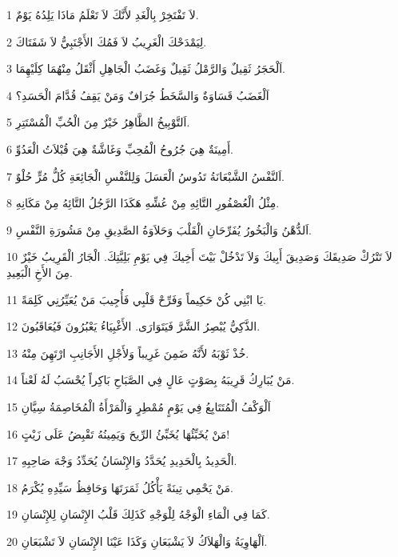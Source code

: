 \par 1 لاَ تَفْتَخِرْ بِالْغَدِ لأَنَّكَ لاَ تَعْلَمُ مَاذَا يَلِدُهُ يَوْمٌ.
\par 2 لِيَمْدَحْكَ الْغَرِيبُ لاَ فَمُكَ الأَجْنَبِيُّ لاَ شَفَتَاكَ.
\par 3 اَلْحَجَرُ ثَقِيلٌ وَالرَّمْلُ ثَقِيلٌ وَغَضَبُ الْجَاهِلِ أَثْقَلُ مِنْهُمَا كِلَيْهِمَا.
\par 4 اَلْغَضَبُ قَسَاوَةٌ وَالسَّخَطُ جُرَافٌ وَمَنْ يَقِفُ قُدَّامَ الْحَسَدِ؟
\par 5 اَلتَّوْبِيخُ الظَّاهِرُ خَيْرٌ مِنَ الْحُبِّ الْمُسْتَتِرِ.
\par 6 أَمِينَةٌ هِيَ جُرُوحُ الْمُحِبِّ وَغَاشَّةٌ هِيَ قُبْلاَتُ الْعَدُوِّ.
\par 7 اَلنَّفْسُ الشَّبْعَانَةُ تَدُوسُ الْعَسَلَ وَلِلنَّفْسِ الْجَائِعَةِ كُلُّ مُرٍّ حُلْوٌ.
\par 8 مِثْلُ الْعُصْفُورِ التَّائِهِ مِنْ عُشِّهِ هَكَذَا الرَّجُلُ التَّائِهُ مِنْ مَكَانِهِ.
\par 9 اَلدُّهْنُ وَالْبَخُورُ يُفَرِّحَانِ الْقَلْبَ وَحَلاَوَةُ الصَّدِيقِ مِنْ مَشُورَةِ النَّفْسِ.
\par 10 لاَ تَتْرُكْ صَدِيقَكَ وَصَدِيقَ أَبِيكَ وَلاَ تَدْخُلْ بَيْتَ أَخِيكَ فِي يَوْمِ بَلِيَّتِكَ. الْجَارُ الْقَرِيبُ خَيْرٌ مِنَ الأَخِ الْبَعِيدِ.
\par 11 يَا ابْنِي كُنْ حَكِيماً وَفَرِّحْ قَلْبِي فَأُجِيبَ مَنْ يُعَيِّرُنِي كَلِمَةً.
\par 12 الذَّكِيُّ يُبْصِرُ الشَّرَّ فَيَتَوَارَى. الأَغْبِيَاءُ يَعْبُرُونَ فَيُعَاقَبُونَ.
\par 13 خُذْ ثَوْبَهُ لأَنَّهُ ضَمِنَ غَرِيباً وَلأَجْلِ الأَجَانِبِ ارْتَهِنَ مِنْهُ.
\par 14 مَنْ يُبَارِكُ قَرِيبَهُ بِصَوْتٍ عَالٍ فِي الصَّبَاحِ بَاكِراً يُحْسَبُ لَهُ لَعْناً.
\par 15 اَلْوَكْفُ الْمُتَتَابِعُ فِي يَوْمٍ مُمْطِرٍ وَالْمَرْأَةُ الْمُخَاصِمَةُ سِيَّانِ
\par 16 مَنْ يُخَبِّئُهَا يُخَبِّئُ الرِّيحَ وَيَمِينُهُ تَقْبِضُ عَلَى زَيْتٍ!
\par 17 الْحَدِيدُ بِالْحَدِيدِ يُحَدَّدُ وَالإِنْسَانُ يُحَدِّدُ وَجْهَ صَاحِبِهِ.
\par 18 مَنْ يَحْمِي تِينَةً يَأْكُلُ ثَمَرَتَهَا وَحَافِظُ سَيِّدِهِ يُكْرَمُ.
\par 19 كَمَا فِي الْمَاءِ الْوَجْهُ لِلْوَجْهِ كَذَلِكَ قَلْبُ الإِنْسَانِ لِلإِنْسَانِ.
\par 20 اَلْهَاوِيَةُ وَالْهَلاَكُ لاَ يَشْبَعَانِ وَكَذَا عَيْنَا الإِنْسَانِ لاَ تَشْبَعَانِ.
